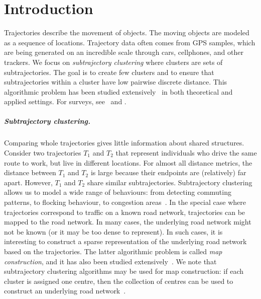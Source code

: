\section{Introduction}
%
Trajectories describe the movement of objects.
The moving objects are modeled as a sequence of locations.
Trajectory data often comes from GPS samples, which are being generated on an incredible scale through cars, cellphones, and other trackers.  
We focus on \emph{subtrajectory clustering} where clusters are sets of subtrajectories. The goal is to create few clusters and to ensure that subtrajectories within a cluster have low pairwise discrete \frechet distance. This algorithmic problem has been studied extensively~\cite{agarwal2018subtrajectory, bruning2022faster, buchin2020improved, buchin2011detecting,  buchin2013median, chen2013pathlet, conradi2023finding, gaffney1999trajectory, gudmundsson2012gpu, gudmundsson2022cubic, gudmundsson2012motifs, hung2015clustering, lee2007trajectory, sung2012trajectory} in both theoretical and applied settings. 
For surveys, see~\cite{bian2018survey} and \cite{machado2024survey}.
%
\subparagraph{Subtrajectory clustering. } 
Comparing whole trajectories gives little information about shared structures. Consider two trajectories $T_1$ and $T_2$ that represent individuals who drive the same route to work, but live in different locations. 
For almost all distance metrics, the distance between $T_1$ and $T_2$ is large because their endpoints are (relatively) far apart. However, $T_1$ and $T_2$ share similar subtrajectories. 
Subtrajectory clustering allows us to model a wide range of behaviours: from detecting commuting patterns, to flocking behaviour, to congestion areas~\cite{buchin2011detecting}. 
In the special case where trajectories correspond to traffic on a known road network,
trajectories can be mapped to the road network. In many cases, the underlying road network might not be known (or it may be too dense to represent).
In such cases, it is interesting to construct a sparse representation of the underlying road network based on the trajectories.
The latter algorithmic problem is called \emph{map construction}, and it has also been studied extensively~\cite{
ahmed2015comparison, biagioni2012map, ahmed2012constructing,cao2009gps, davies2006scalable,karagiorgou2012vehicle, karagiorgou2013segmentation}.
We note that subtrajectory clustering algorithms may be used for map construction: if each cluster is assigned one centre, then the collection of centres can be used to construct an underlying road network~\cite{buchin2017clustering, buchin2020improved}.
